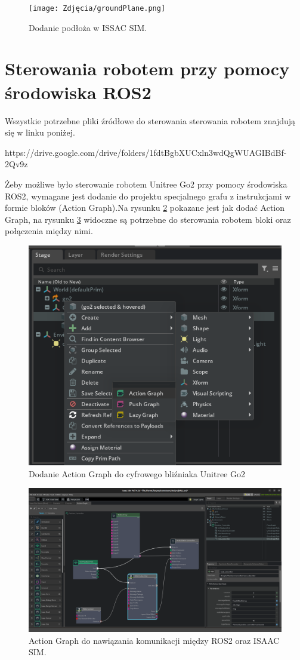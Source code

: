 \documentclass[12pt]{article}
\begin{document}
\begin{figure}[h]
    \centering
    \texttt{[image: Zdjęcia/groundPlane.png]}
    \caption{Dodanie podłoża w ISSAC SIM.}
    \label{fig:groundPlane}
\end{figure}

\clearpage

\section{Sterowania robotem przy pomocy środowiska ROS2}

Wszystkie potrzebne pliki źródłowe do sterowania sterowania robotem znajdują się w linku poniżej.

https://drive.google.com/drive/folders/1fdtBgbXUCxln3wdQgWUAGIBdBf-2Qv9z
\vspace{10pt}

Żeby możliwe było sterowanie robotem Unitree Go2 przy pomocy środowiska ROS2, wymagane jest dodanie do projektu specjalnego grafu z instrukcjami w formie bloków (Action Graph).Na rysunku \ref{fig:jakDodacAction} pokazane jest jak dodać Action Graph, na rysunku \ref{fig:actionGraph} widoczne są potrzebne do sterowania robotem bloki oraz połączenia między nimi. 

\begin{figure}[h]
    \centering
    \includegraphics[width=0.5\linewidth]{Zdjęcia/dodanieActionGraph.png}
    \caption{Dodanie Action Graph do cyfrowego bliźniaka Unitree Go2}
    \label{fig:jakDodacAction}
\end{figure}

\clearpage

\begin{figure}[h]
    \centering
    \includegraphics[width=0.75\linewidth]{Zdjęcia/actionGraph.png}
    \caption{Action Graph do nawiązania komunikacji między ROS2 oraz ISAAC SIM.}
    \label{fig:actionGraph}
\end{figure}
\end{document}

